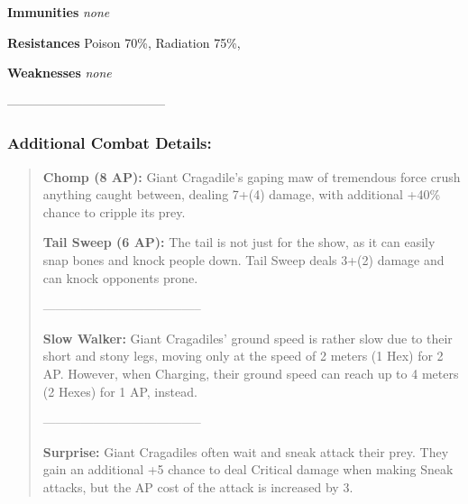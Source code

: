 \documentclass[11pt,a4paper,twocolumn]{book}
\begin{document}

\noindent
\textbf{Immunities} \emph{none} %

\noindent
\textbf{Resistances} Poison 70\%, Radiation 75\%,%

\noindent
\textbf{Weaknesses} \emph{none}%

--------------------------------------
	
	\subsubsection*{Additional Combat Details:}
	\begin{verse}

		\textbf{Chomp (8 AP):} Giant Cragadile's gaping maw of tremendous force crush anything caught between, dealing 7+(4) damage, with additional +40\% chance to cripple its prey.
		
		
		\textbf{Tail Sweep (6 AP):} The tail is not just for the show, as it can easily snap bones and knock people down. Tail Sweep deals 3+(2) damage and can knock opponents prone.
		
--------------------------------------		
		
		\textbf{Slow Walker:} Giant Cragadiles' ground speed is rather slow due to their short and stony legs, moving only at the speed of 2 meters (1 Hex) for 2 AP. However, when Charging, their ground speed can reach up to 4 meters (2 Hexes) for 1 AP, instead.
		
		--------------------------------------
		
		\textbf{Surprise:} Giant Cragadiles often wait and sneak attack their prey. They gain an additional +5 chance to deal Critical damage when making Sneak attacks, but the AP cost of the attack is increased by 3.
		
%		
	\end{verse}
	
\end{document}
